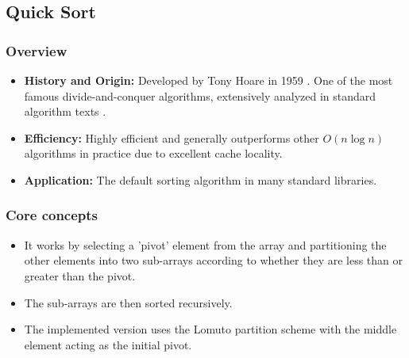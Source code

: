 \subsection[Quick Sort]{Quick Sort \cite{hoare1962quicksort}}
    \subsubsection{Overview}
        \begin{itemize}
            \item \textbf{History and Origin:} Developed by Tony Hoare in 1959 \cite{hoare1962quicksort}. One of the most famous divide-and-conquer algorithms, extensively analyzed in standard algorithm texts \cite{cormen2009introduction}.
            \item \textbf{Efficiency:} Highly efficient and generally outperforms other $O(n \log n)$ algorithms in practice due to excellent cache locality.
            \item \textbf{Application:} The default sorting algorithm in many standard libraries.
        \end{itemize}
    \subsubsection{Core concepts}
        \begin{itemize}
            \item It works by selecting a 'pivot' element from the array and partitioning the other elements into two sub-arrays according to whether they are less than or greater than the pivot.
            \item The sub-arrays are then sorted recursively.
            \item The implemented version uses the Lomuto partition scheme with the middle element acting as the initial pivot.
        \end{itemize}

